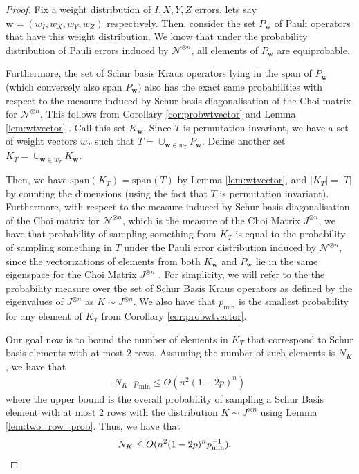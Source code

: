 \documentclass[10pt,a4paper]{amsart}
\begin{document}
\begin{proof}
    Fix a weight distribution of $I,X,Y,Z$ errors, lets say $\mathbf w=(w_I,w_X,w_Y,w_Z)$ respectively. Then, consider the set $P_{\mathbf w}$ of Pauli operators that have this weight distribution. We know that under the probability distribution of Pauli errors induced by $\mathcal N^{\otimes n}$, all elements of $P_{\mathbf w}$ are equiprobable. 

    Furthermore, the set of Schur basis Kraus operators lying in the span of $P_{\mathbf w}$ (which conversely also span $P_{\mathbf w})$ also has the exact same probabilities with respect to the measure induced by Schur basis diagonalisation of the Choi matrix for $\mathcal N^{\otimes n}$.  This follows from Corollary \ref{cor:probwtvector} and Lemma \ref{lem:wtvector}  . Call this set $K_{\mathbf w}$. Since $T$ is permutation invariant, we have a set of weight vectors $w_T$ such that $T=\cup_{\mathbf w\in w_T} P_\mathbf{w}$. Define another set $K_T=\cup_{\mathbf w\in w_T} K_{\mathbf w} $.

    Then, we have $\mathrm{span}(K_T)=\mathrm{span}(T)$ by Lemma \ref{lem:wtvector}, and $|K_T|=|T|$ by counting the dimensions (using the fact that $T$ is permutation invariant). Furthermore, with respect to the measure induced by Schur basis diagonalisation of the Choi matrix for $\mathcal N^{\otimes n}$, which is the  measure of the Choi Matrix $J^{\otimes n}$, we have that probability of sampling something from $K_T$ is equal to the probability of sampling something in $T$ under the Pauli error distribution induced by $\mathcal N^{\otimes n}$, since the vectorizations of elements from both $K_\mathbf w$ and $P_{\mathbf w}$ lie in the same eigenspace for the Choi Matrix $J^{\otimes n}$ . For simplicity, we will refer to the the probability measure over the set of Schur Basis Kraus operators as defined by the eigenvalues of $J^{\otimes n}$ as $K\sim J^{\otimes n}$. We also have that $p_{\min}$ is the smallest probability for any element of $K_T$ from Corollary \ref{cor:probwtvector}.

    
    Our goal now is to bound the number of elements in $K_T$ that correspond to Schur basis elements with at most $2$ rows. Assuming the number of such elements is $N_K$, we have that
    \begin{align*}
        N_K\cdot p_{\min}\leq O(n^2(1-2p)^n)
    \end{align*}
    where the upper bound is the overall probability of sampling a Schur Basis element with at most 2 rows with the distribution $K\sim J^{\otimes n}$ using Lemma \ref{lem:two_row_prob}. Thus, we have that
    \begin{align*}
        N_K\leq O(n^2(1-2p)^np_{\min}^{-1}). &\qedhere
    \end{align*}
\end{proof}
\end{document}
